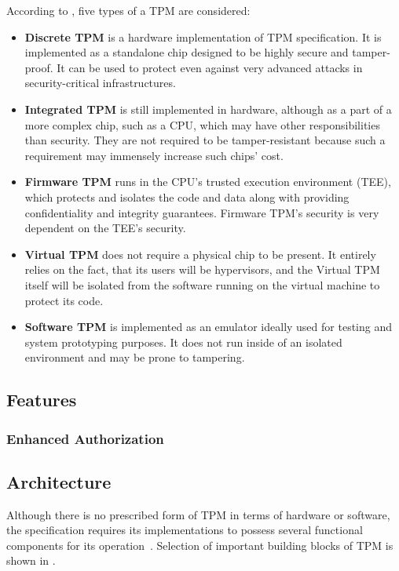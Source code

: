 According to \cite{tcg_tpm2_briefintro}, five types of a TPM are considered:

\begin{itemize}
    \item \textbf{Discrete TPM} is a hardware implementation of TPM specification. It is implemented as a standalone chip designed to be highly secure and tamper-proof. It can be used to protect even against very advanced attacks in security-critical infrastructures.
    \item \textbf{Integrated TPM} is still implemented in hardware, although as a part of a more complex chip, such as a CPU, which may have other responsibilities than security. They are not required to be tamper-resistant because such a requirement may immensely increase such chips' cost.
    \item \textbf{Firmware TPM} runs in the CPU's trusted execution environment (TEE), which protects and isolates the code and data along with providing confidentiality and integrity guarantees. Firmware TPM's security is very dependent on the TEE's security.
    \item \textbf{Virtual TPM} does not require a physical chip to be present. It entirely relies on the fact, that its users will be hypervisors, and the Virtual TPM itself will be isolated from the software running on the virtual machine to protect its code. 
    \item \textbf{Software TPM} is implemented as an emulator ideally used for testing and system prototyping purposes. It does not run inside of an isolated environment and may be prone to tampering.
\end{itemize}

\subsection{Features}
\subsubsection{Enhanced Authorization}

\subsection{Architecture}
Although there is no prescribed form of TPM in terms of hardware or software, the specification requires its implementations to possess several functional components for its operation~\cite{tcg_p1_architecture}. Selection of important building blocks of TPM is shown in .

